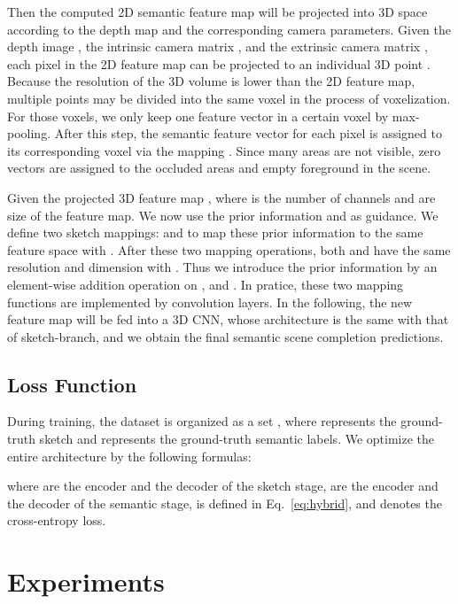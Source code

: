 \documentclass[10pt,twocolumn,letterpaper]{article}
\begin{document}
Then the computed 2D semantic feature map will be projected into 3D space according to the depth map and the corresponding camera parameters. Given the depth image , the intrinsic camera matrix , and the extrinsic camera matrix , each pixel  in the 2D feature map can be projected to an individual 3D point . Because the resolution of the 3D volume is lower than the 2D feature map, multiple points may be divided into the same voxel in the process of voxelization. For those voxels, we only keep one feature vector in a certain voxel by max-pooling. After this step, the semantic feature vector for each pixel is assigned to its corresponding voxel via the mapping . Since many areas are not visible, zero vectors are assigned to the occluded areas and empty foreground in the scene.

Given the projected 3D feature map , where  is the number of channels and  are size of the feature map. We now use the prior information  and  as guidance. We define two sketch mappings:  and  to map these prior information to the same feature space with . After these two mapping operations, both  and  have the same resolution and dimension with . Thus we introduce the prior information by an element-wise addition operation on ,  and . In pratice, these two mapping functions are implemented by  convolution layers. In the following, the new feature map will be fed into a 3D CNN, whose architecture is the same with that of sketch-branch, and we obtain the final semantic scene completion predictions.

\subsection{Loss Function}
During training, the dataset is organized as a set , where  represents the ground-truth sketch and  represents the ground-truth semantic labels. We optimize the entire architecture by the following formulas:

where  are the encoder and the decoder of the sketch stage,  are the encoder and the decoder of the semantic stage,  is defined in Eq.~\eqref{eq:hybrid}, and  denotes the cross-entropy loss.



\section{Experiments}
\end{document}
